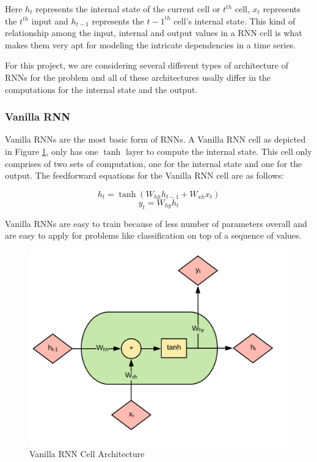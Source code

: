 \documentclass[letterpaper, 10 pt, conference]{ieeeconf}  %
\begin{document}
Here $h_t$ represents the internal state of the current cell or $t^{th}$ cell, $x_t$ represents the $t^{th}$ input and $h_{t-1}$ represents the ${t-1}^{th}$ cell's internal state. This kind of relationship among the input, internal and output values in a RNN cell is what makes them very apt for modeling the intricate dependencies in a time series.

For this project, we are considering several different types of architecture of RNNs for the problem and all of these architectures usally differ in the computations for the internal state and the output.

\subsubsection{Vanilla RNN}
Vanilla RNNs are the most basic form of RNNs. A Vanilla RNN cell as depicted in Figure \ref{fig:Vanilla_RNN_Arch}, only has one $\tanh$ layer to compute the internal state. This cell only comprises of two sets of computation, one for the internal state and one for the output. The feedforward equations for the Vanilla RNN cell are as follows:

\begin{equation}
h_{t} = \tanh(W_{hh}h_{t-1} + W_{xh}x_t)
\end{equation}
\begin{equation}
y_{t} = W_{hy}h_{t}
\end{equation}

Vanilla RNNs are easy to train because of less number of parameters overall and are easy to apply for problems like classification on top of a sequence of values. 


\begin{figure}[!h]
\centering
\includegraphics[scale=0.20]{../figs/vrnn/diagram.png}	
\caption{Vanilla RNN Cell Architecture}
\label{fig:Vanilla_RNN_Arch} 
\end{figure}
\end{document}
